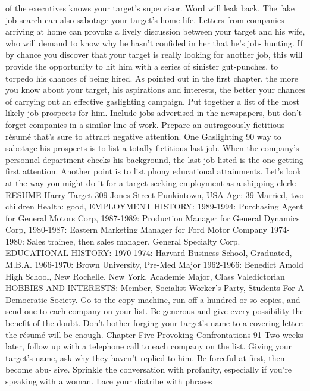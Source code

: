 \documentclass{book}
\begin{document}
of the executives knows your target's supervisor. Word will leak 
back. 
The fake job search can also sabotage your target's home 
life. Letters from companies arriving at home can provoke a 
lively discussion between your target and his wife, who will 
demand to know why he hasn't confided in her that he's job- 
hunting. 
If by chance you discover that your target is really looking 
for another job, this will provide the opportunity to hit him with 
a series of sinister gut-punches, to torpedo his chances of being 
hired. As pointed out in the first chapter, the more you know 
about your target, his aspirations and interests, the better your 
chances of carrying out an effective gaslighting campaign. 
Put together a list of the most likely job prospects for him. 
Include jobs advertised in the newspapers, but don't forget 
companies in a similar line of work. Prepare an outrageously 
fictitious résumé that's sure to attract negative attention. One  Gaslighting 
90 
way to sabotage his prospects is to list a totally fictitious last 
job. When the company's personnel department checks his 
background, the last job listed is the one getting first attention. 
Another point is to list phony educational attainments. Let's 
look at the way you might do it for a target seeking employment 
as a shipping clerk: 
RESUME 
Harry Target 309 Jones Street 
Punkintown, USA 
Age: 39 
Married, two children 
Health: good, 
EMPLOYMENT HISTORY: 
1989-1994: Purchasing Agent for General Motors Corp, 
1987-1989: Production Manager for General Dynamics Corp, 
1980-1987: Eastern Marketing Manager for Ford Motor Company 
1974-1980: Sales trainee, then sales manager, General Specialty Corp. 
EDUCATIONAL HISTORY: 
1970-1974: Harvard Business School, Graduated, M.B.A. 
1966-1970: Brown University, Pre-Med Major 
1962-1966: Benedict Amold High School, New Rochelle, New York, 
Academie Major, Class Valedictorian 
HOBBIES AND INTERESTS: 
Member, Socialist Worker's Party, Students For A Democratic Society. 
Go to the copy machine, run off a hundred or so copies, and 
send one to each company on your list. Be generous and give 
every possibility the benefit of the doubt. Don't bother forging 
your target's name to a covering letter: the résumé will be 
enough. 
Chapter Five 
Provoking Confrontations 
91 
Two weeks later, follow up with a telephone call to each 
company on the list. Giving your target's name, ask why they 
haven't replied to him. Be forceful at first, then become abu- 
sive. Sprinkle the conversation with profanity, especially if 
you're speaking with a woman. Lace your diatribe with phrases 
\end{document}
